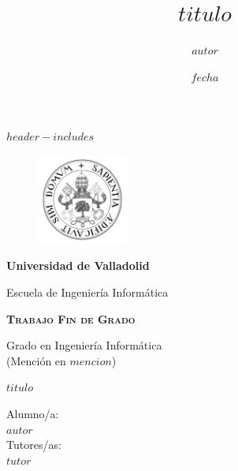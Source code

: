 $header-includes$

\date{$fecha$}
\author{$autor$}
\title{$titulo$}


    {\selectfont
    \begin{titlepage}
        \begin{center}
            \vspace*{-1in}
            \begin{figure}[htb]
                \begin{center}
                    \includegraphics[width=3cm]{./latex/img/logo}
                \end{center}
            \end{figure}
            \begin{Large}
                \textbf{ Universidad de Valladolid }\\
            \end{Large}
            \vspace*{0.75in}
            \begin{Huge}
                { Escuela de Ingeniería Informática }\\
            \end{Huge}
            \vspace*{0.3in}
            \begin{Large}
                \textbf{\textsc{Trabajo Fin de Grado}}\\
            \end{Large}
            \vspace*{0.5in}
            \begin{Large}
                { Grado en Ingeniería Informática}\\
                { (Mención en $mencion$) }\\
            \end{Large}
            \vspace*{1in}
            \begin{Huge}
                \textbf{ $titulo$ }
            \end{Huge}
            \vspace*{1.6in}
            \begin{large}
                \begin{flushright}
                    Alumno/a: \\
                    \textbf{ $autor$ }\\
                    \vspace*{0.3in}
                    Tutores/as: \\
                    \textbf{ $tutor$ }
                \end{flushright}
            \end{large}
        \end{center}
    \end{titlepage}
    }
